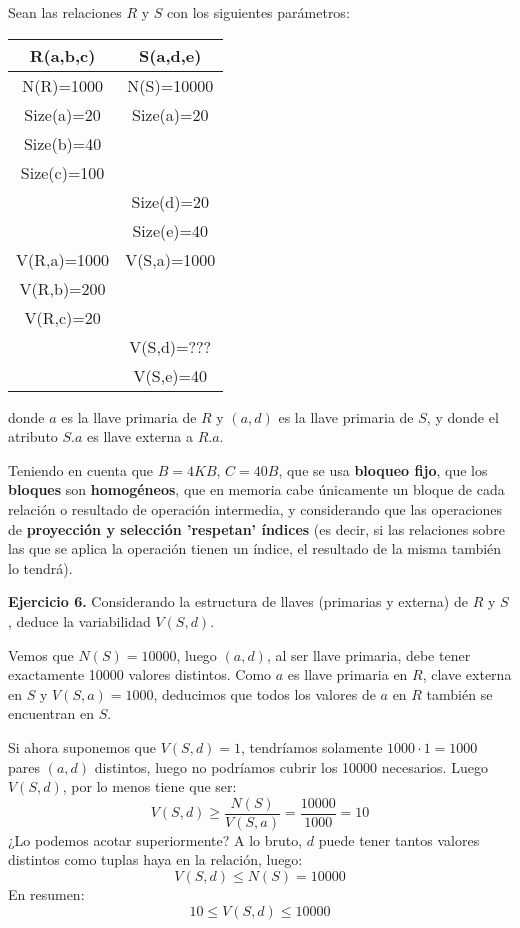 \documentclass[12pt]{report}
\begin{document}
Sean las relaciones $R$ y $S$ con los siguientes parámetros:

\begin{center}
\begin{tabular}{|c|c|}
\hline 
R(a,b,c) & S(a,d,e) \\ 
\hline 
N(R)=1000 & N(S)=10000 \\ 
\hline 
Size(a)=20 & Size(a)=20 \\ 
\hline 
Size(b)=40 &   \\ 
\hline 
Size(c)=100 &   \\ 
\hline 
  & Size(d)=20 \\ 
\hline 
  & Size(e)=40 \\ 
\hline 
V(R,a)=1000 & V(S,a)=1000 \\ 
\hline 
V(R,b)=200 &   \\ 
\hline 
V(R,c)=20 &   \\ 
\hline 
  & V(S,d)=??? \\ 
\hline 
  & V(S,e)=40 \\ 
\hline 
\end{tabular} 
\end{center}
donde $a$ es la llave primaria de $R$ y $(a,d)$ es la llave primaria de $S$, y donde el atributo $S.a$ es llave externa a $R.a$.


Teniendo en cuenta que $B=4KB$, $C=40B$, que se usa \textbf{bloqueo fijo}, que los \textbf{bloques} son \textbf{homogéneos}, que en memoria cabe únicamente un bloque de cada relación o resultado de operación intermedia, y considerando que las operaciones de \textbf{proyección y selección 'respetan' índices} (es decir, si las relaciones sobre las que se aplica la operación tienen un índice, el resultado de la misma también lo tendrá).

\textbf{Ejercicio 6.} Considerando la estructura de llaves (primarias y externa) de $R$ y $S$, deduce la variabilidad $V(S,d)$.

Vemos que $N(S)=10000$, luego $(a,d)$, al ser llave primaria, debe tener exactamente 10000 valores distintos. Como $a$ es llave primaria en $R$, clave externa en $S$ y $V(S,a)=1000$, deducimos que todos los valores de $a$ en $R$ también se encuentran en $S$. 

Si ahora suponemos que $V(S,d)=1$, tendríamos solamente $1000\cdot 1 = 1000$ pares $(a,d)$ distintos, luego no podríamos cubrir los 10000 necesarios. Luego $V(S,d)$, por lo menos tiene que ser:
\[
V(S,d)\geq \frac{N(S)}{V(S,a)}=\frac{10000}{1000}=10
\]
¿Lo podemos acotar superiormente? A lo bruto, $d$ puede tener tantos valores distintos como tuplas haya en la relación, luego:
\[
V(S,d)\leq N(S) = 10000
\]
En resumen:
\[
10 \leq V(S,d) \leq 10000
\]
\end{document}
